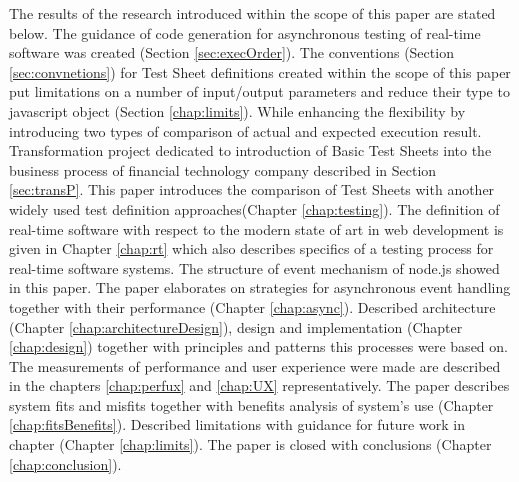 The results of the research introduced within the scope of this paper are stated below.
The guidance of code generation for asynchronous testing of real-time software was created (Section \ref{sec:execOrder}). 
The conventions (Section \ref{sec:convnetions}) for Test Sheet definitions created within the scope of this paper put limitations on a number of input/output parameters and reduce their type to javascript object (Section \ref{chap:limits}).
While enhancing the flexibility by introducing two types of comparison of actual and expected execution result. 
Transformation project dedicated to introduction of Basic Test Sheets into the business process of financial technology company described in Section \ref{sec:transP}.
This paper introduces the comparison of Test Sheets with another widely used test definition approaches(Chapter \ref{chap:testing}). 
The definition of real-time software with respect to the modern state of art in web development is given in Chapter \ref{chap:rt} which also describes specifics of a testing process for real-time software systems.
The structure of event mechanism of node.js showed in this paper. The paper elaborates on strategies for asynchronous event handling together with their performance (Chapter \ref{chap:async}). 
Described architecture (Chapter \ref{chap:architectureDesign}), design and implementation (Chapter \ref{chap:design}) together with principles and patterns this processes were based on. 
The measurements of performance and user experience were made are described in the chapters \ref{chap:perfux} and \ref{chap:UX} representatively. 
The paper describes system fits and misfits together with benefits analysis of system's use (Chapter \ref{chap:fitsBenefits}).
Described limitations with guidance for future work in chapter (Chapter \ref{chap:limits}). The paper is closed with conclusions (Chapter \ref{chap:conclusion}).



